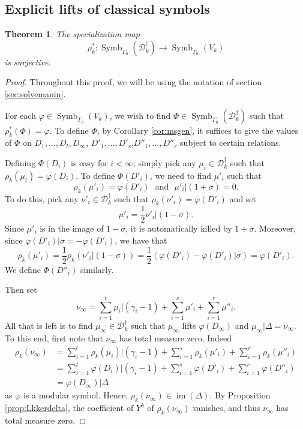 \documentclass{amsart}
\theoremstyle{plain}
\newtheorem{thm}{Theorem}[section]
\theoremstyle{definition}
\newcommand{\D}{{\mathcal D}}
\newcommand{\maps}{\rightarrow}
\renewcommand{\sp}{{\rho^*_k}}
\newcommand{\spd}{{\rho_k}}
\newcommand{\Dkoc}{\D_k^\dag}
\DeclareMathOperator{\Symb}{Symb}
\DeclareMathOperator{\im}{im}
\newcommand{\MSo}[1]{\Symb_{\Gamma_0}(#1)}
\begin{document}
\subsection{Explicit lifts of classical symbols}
\label{sec:lift}

\begin{thm}
\label{thm:surj1}
The specialization map
$$
\sp : \MSo{\Dkoc} \maps \MSo{V_k}
$$
is surjective.
\end{thm}

\begin{proof}
Throughout this proof, we will be using the notation of section \ref{sec:solvemanin}.

For each $\varphi \in \MSo{V_k}$, we wish to find $\Phi \in \MSo{\Dkoc}$ such that $\sp(\Phi) = \varphi$.  To define $\Phi$, by Corollary \ref{cor:msgen}, it suffices to give the values of $\Phi$ on
$D_1, \dots, D_t, D_\infty$, $D'_1, \dots, D'_s$,$D''_1, \dots, D''_r$
subject to certain relations.

Defining $\Phi(D_i)$ is easy for $i < \infty$; simply pick any
$\mu_i \in \Dkoc$ such that $\spd(\mu_i) = \varphi(D_i)$.  To
define $\Phi(D'_i)$, we need to find $\mu'_i$ such that
$$
\spd(\mu'_i) = \varphi(D'_i) \text{~~and~~} \mu'_i\big| (1 + \sigma)
= 0.
$$
To do this, pick any $\nu'_i \in \Dkoc$ such that
$\spd(\nu'_i) = \varphi(D'_i)$ and set 
$$\mu'_i = \frac{1}{2} \nu'_i\big| (1 - \sigma).$$  Since $\mu'_i$ is in the image of $1 - \sigma$, it is automatically killed by $1 + \sigma$.
Moreover, since $\varphi(D'_i)\big| \sigma = -\varphi(D'_i)$, we
have that
$$
\spd(\mu'_i) = \frac{1}{2} \spd(\nu'_i\big| (1-\sigma)) =
\frac{1}{2} (\varphi(D'_i) - \varphi(D'_i)\big| \sigma) =
\varphi(D'_i).
$$
We define $\Phi(D''_i)$ similarly.

Then set 
\begin{equation*}
\nu_\infty = \sum_{i=1}^t \mu_i \big| (\gamma_i-1) + \sum_{i=1}^s \mu'_i + \sum_{i=1}^r \mu''_i.
\end{equation*}
All that is left is to find $\mu_\infty \in \Dkoc$ such that $\mu_\infty$ lifts $\varphi(D_\infty)$ and $\mu_\infty \big| \Delta = \nu_\infty$.  To this end, first note that $\nu_\infty$ has total measure zero.  Indeed
\begin{align*}
\spd(\nu_\infty) 
&= \sum_{i=1}^t \spd(\mu_i) \big| (\gamma_i-1) + \sum_{i=1}^s \spd(\mu'_i) + \sum_{i=1}^r \spd(\mu''_i) \\
&= \sum_{i=1}^t \varphi(D_i) \big| (\gamma_i-1) + \sum_{i=1}^s \varphi(D'_i) + \sum_{i=1}^r \varphi(D''_i) \\
&= \varphi(D_\infty) \big| \Delta
\end{align*}
as $\varphi$ is a modular symbol.  Hence, $\spd(\nu_\infty) \in \im(\Delta)$.  By Proposition \ref{prop:Lkkerdelta}, the coefficient of $Y^k$ of $\spd(\nu_\infty)$ vanishes, and thus $\nu_\infty$ has total measure zero.


\end{proof}
\end{document}
